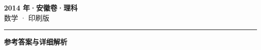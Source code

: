 \documentclass[zihao=5, a4paper]{ctexart}
\begin{document}
\begin{center}
  {\Large\bfseries 2014 年·安徽卷·理科}\\[4pt]
  {\large 数学 · 印刷版}
\end{center}
\medskip
{}

\par\bigskip\hrule\bigskip
{}
\Needspace{0.55\textheight}
\begin{center}{\large\bfseries 参考答案与详细解析}\end{center}
\smallskip

\end{document}
